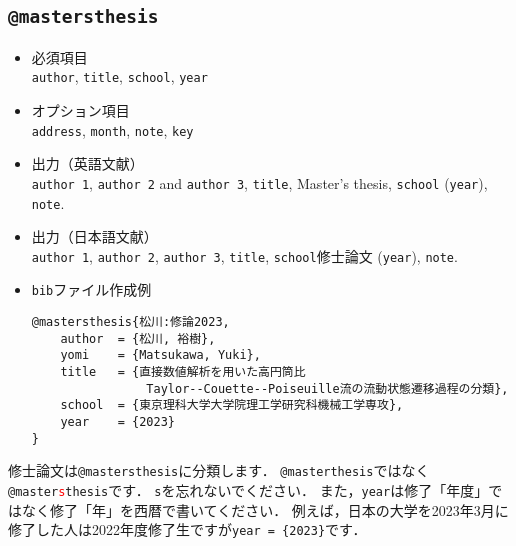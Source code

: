 \documentclass[a4paper,fleqn,uplatex,dvipdfmx]{jsarticle}
\begin{document}
\subsection{\texttt{@mastersthesis}}
\label{ssec:mastersthesis}
\begin{screen}
    \begin{itemize}
        \item 必須項目 \\
        \verb|author|, \verb|title|, \verb|school|, \verb|year|
        \item オプション項目 \\
        \verb|address|, \verb|month|, \verb|note|, \verb|key|
        \item 出力（英語文献） \\
            \colorbox[gray]{0.8}{\texttt{author 1}}, \colorbox[gray]{0.8}{\texttt{author 2}} and \colorbox[gray]{0.8}{\texttt{author 3}}, \colorbox[gray]{0.8}{\texttt{title}}, Master's thesis, \colorbox[gray]{0.8}{\texttt{school}} (\colorbox[gray]{0.8}{\texttt{year}}), \colorbox[gray]{0.8}{\texttt{note}}.
        \item 出力（日本語文献） \\
            \colorbox[gray]{0.8}{\texttt{author 1}}, \colorbox[gray]{0.8}{\texttt{author 2}}, \colorbox[gray]{0.8}{\texttt{author 3}}, \colorbox[gray]{0.8}{\texttt{title}}, \colorbox[gray]{0.8}{\texttt{school}}修士論文 (\colorbox[gray]{0.8}{\texttt{year}}), \colorbox[gray]{0.8}{\texttt{note}}.
        \item \verb|bib|ファイル作成例 \vspace{-3mm}
\begin{verbatim}
@mastersthesis{松川:修論2023,
    author  = {松川, 裕樹},
    yomi    = {Matsukawa, Yuki},
    title   = {直接数値解析を用いた高円筒比
                Taylor--Couette--Poiseuille流の流動状態遷移過程の分類},
    school  = {東京理科大学大学院理工学研究科機械工学専攻},
    year    = {2023}
}
\end{verbatim}
    \end{itemize}
\end{screen}

修士論文は\verb|@mastersthesis|に分類します．
\verb|@masterthesis|ではなく\texttt{@master\textcolor{red}{s}thesis}です．
\verb|s|を忘れないでください．
また，\verb|year|は修了「年度」ではなく修了「年」を西暦で書いてください．
例えば，日本の大学を2023年3月に修了した人は2022年度修了生ですが\verb|year = {2023}|です．
\end{document}
